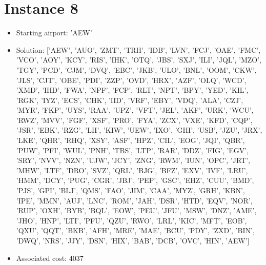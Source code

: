 \section*{Instance 8}
\begin{itemize}
    \item Starting airport: 'AEW'
    \item Solution: ['AEW', 'AUO', 'ZMT', 'TRH', 'IDB', 'LVN', 'FCJ', 'OAE', 'FMC', 'VCO', 'AOY', 'KCY', 'RIS', 'IHK', 'OTQ', 'JBS', 'SXJ', 'ILI', 'JQL', 'MZO', 'TGY', 'PCD', 'CJM', 'DVQ', 'EBC', 'JKB', 'ULO', 'BNL', 'OOM', 'CKW', 'JLS', 'CJT', 'OBE', 'PDI', 'ZZP', 'OVD', 'HRX', 'AZF', 'OLQ', 'WCD', 'XMD', 'IHD', 'FWA', 'NPF', 'FCP', 'RLT', 'NPT', 'BPY', 'YED', 'KIL', 'RGK', 'IYZ', 'ECS', 'CHK', 'IID', 'VRF', 'EBY', 'VDQ', 'ALA', 'CZJ', 'MYR', 'FKP', 'UYS', 'RAA', 'UPZ', 'VFT', 'JEL', 'AKF', 'URK', 'WCU', 'RWZ', 'MVV', 'FGF', 'XSF', 'PRO', 'FYA', 'ZCX', 'VXE', 'KFD', 'CQP', 'JSR', 'EBK', 'RZG', 'LII', 'KIW', 'UEW', 'IXO', 'GHI', 'USB', 'JZU', 'JRX', 'LKE', 'QHR', 'RHQ', 'XSY', 'ASF', 'HPZ', 'CIL', 'EOG', 'JQI', 'QBR', 'PUW', 'PFI', 'WUL', 'PNH', 'TBS', 'LTP', 'RAR', 'DDZ', 'FIG', 'EGV', 'SRY', 'NVV', 'NZN', 'UJW', 'JCY', 'ZNG', 'RWM', 'IUN', 'OPC', 'JRT', 'MHW', 'LTF', 'DRO', 'SVZ', 'QRL', 'BJG', 'BFZ', 'EXV', 'IVF', 'LRU', 'HMM', 'DCY', 'PUG', 'CGR', 'JBJ', 'PEP', 'GSC', 'EHZ', 'CUU', 'BMD', 'PJS', 'GPI', 'BLJ', 'QMS', 'FAO', 'JIM', 'CAA', 'MYZ', 'GRH', 'KBN', 'IPE', 'MMN', 'AUJ', 'LNC', 'ROM', 'JAH', 'DSR', 'HTD', 'EQV', 'NOR', 'RUP', 'OXH', 'BYB', 'BQL', 'EOW', 'PEU', 'JFU', 'MSW', 'DNZ', 'AME', 'JHO', 'HNP', 'LTI', 'PFU', 'QZU', 'RWO', 'LRL', 'KIC', 'MFT', 'EOB', 'QXU', 'QQT', 'BKB', 'AFH', 'MRE', 'MAE', 'BCU', 'PDY', 'ZXD', 'BIN', 'DWQ', 'NRS', 'JJY', 'DSN', 'HIX', 'BAB', 'DCB', 'OVC', 'HIN', 'AEW']
    \item Associated cost: 4037
\end{itemize}


